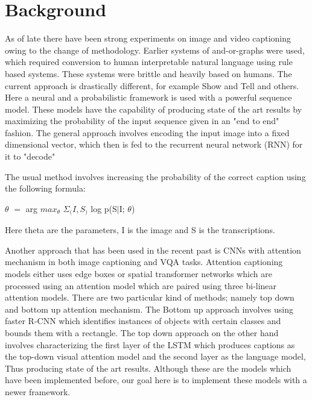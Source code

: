 \documentclass[a4paper]{article}
\begin{document}
\section{Background}
As of late there have been strong experiments on image and video captioning owing to the change of methodology. Earlier systems of and-or-graphs were used, which required conversion to human interpretable natural language using rule based systems. These systems were brittle and heavily based on humans. The current approach is drastically different, for example Show and Tell \cite{DBLP:journals/corr/VinyalsTBE14} and others. Here a neural and a probabilistic framework is used with a powerful sequence model. These models have the capability of producing state of the art results by maximizing the probability of the input sequence given in an "end to end" fashion. The general approach involves encoding the input image into a fixed dimensional vector, which then is fed to the recurrent neural network (RNN) for it to "decode" \par
The usual method involves increasing the probability of the correct caption using the following formula:\par

$\theta$ $=$ arg $max_\theta$ $\Sigma_(I,S_)$ log p(S$|$I; $\theta$) \par \cite{DBLP:journals/corr/VinyalsTBE14}
Here theta are the parameters, I is the image and S is the transcriptions.  \par
Another approach that has been used in the recent past is CNNs with attention mechanism in both image captioning and VQA tasks. Attention captioning models either uses edge boxes \cite{zitnick2014edge} or spatial transformer networks \cite{DBLP:journals/corr/JaderbergSZK15} which are processed using an attention model which are paired using three bi-linear attention models. There are two particular kind of methods; namely top down and bottom up attention mechanism. The Bottom up approach involves using faster R-CNN \cite{ren2015faster}which identifies instances of objects with certain classes and bounds them with a rectangle. The top down approach on the other hand involves characterizing the first layer of the LSTM which produces captions as the top-down visual attention model and the second layer as the language model, Thus producing state of the art results. Although these are the models which have been implemented before, our goal here is to implement these models with a newer framework.
\end{document}
